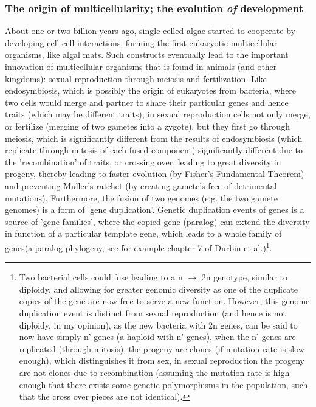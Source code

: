\subsubsection{The origin of multicellularity; the evolution \textit{of} development}
About one or two billion years ago, single-celled algae started to cooperate by developing cell cell interactions, forming the first eukaryotic multicellular  organisms, like algal mats.  Such constructs eventually lead to the important innovation of multicellular organisms that is found in animals (and other kingdoms): sexual reproduction through meiosis and fertilization.  Like endosymbiosis, which is possibly the origin of eukaryotes from bacteria, where two cells would merge and partner to share their particular genes and hence traits (which may be different traits), in sexual reproduction cells not only merge, or fertilize (merging of two gametes into a zygote), but they first go through meiosis, which is significantly different from the results of endosymbiosis (which replicate through mitosis of each fused component) significantly different due to the 'recombination' of traits, or crossing over, leading to great diversity in progeny, thereby leading to faster evolution (by Fisher's Fundamental Theorem) and preventing Muller's ratchet (by creating gamete's free of detrimental mutations).  Furthermore, the fusion of two genomes (e.g. the two gamete genomes) is a form of 'gene duplication'.  Genetic duplication events of genes is a source of 'gene families', where the copied gene (paralog) can extend the diversity in function of a particular template gene, which leads to a whole family of genes(a paralog phylogeny, see for example chapter 7 of Durbin et al.\cite{BSA})\footnote{Two bacterial cells could fuse leading to a n $\rightarrow$ 2n genotype, similar to diploidy, and allowing for greater genomic diversity as one of the duplicate copies of the gene are now free to serve a new function.  However, this genome duplication event is distinct from sexual reproduction (and hence is not diploidy, in my opinion), as the new bacteria with 2n genes, can be said to now have simply n' genes (a haploid with n' genes), when the n' genes are replicated (through mitosis), the progeny are clones (if mutation rate is slow enough), which distinguishes it from sex, in sexual reproduction the progeny are not clones due to recombination (assuming the mutation rate is high enough that there exists some genetic polymorphisms in the population, such that the cross over pieces are not identical).}.  

